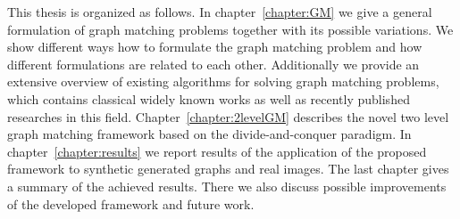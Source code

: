 This thesis is organized as follows. In chapter~\ref{chapter:GM} we give a general formulation of graph matching problems together with its possible variations. We show different ways how to formulate the graph matching problem and how different formulations are related to each other. Additionally we provide an extensive overview of existing algorithms for solving graph matching problems, which contains classical widely known works as well as recently published researches in this field.
Chapter~\ref{chapter:2levelGM} describes the novel two level graph matching framework based on the divide-and-conquer paradigm. %
In chapter~\ref{chapter:results} we report results of the application of the proposed framework to synthetic generated graphs and real images. The last chapter gives a summary of the achieved results. There we also discuss possible improvements of the developed framework and future work.
